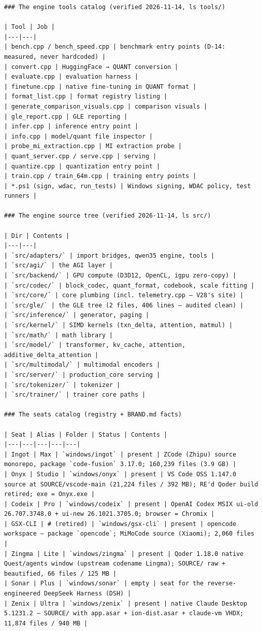 \begin{Verbatim}[breaklines,breakanywhere,fontsize=\footnotesize]
### The engine tools catalog (verified 2026-11-14, ls tools/)

| Tool | Job |
|---|---|
| bench.cpp / bench_speed.cpp | benchmark entry points (D-14: measured, never hardcoded) |
| convert.cpp | HuggingFace → QUANT conversion |
| evaluate.cpp | evaluation harness |
| finetune.cpp | native fine-tuning in QUANT format |
| format_list.cpp | format registry listing |
| generate_comparison_visuals.cpp | comparison visuals |
| gle_report.cpp | GLE reporting |
| infer.cpp | inference entry point |
| info.cpp | model/quant file inspector |
| probe_mi_extraction.cpp | MI extraction probe |
| quant_server.cpp / serve.cpp | serving |
| quantize.cpp | quantization entry point |
| train.cpp / train_64m.cpp | training entry points |
| *.ps1 (sign, wdac, run_tests) | Windows signing, WDAC policy, test runners |

### The engine source tree (verified 2026-11-14, ls src/)

| Dir | Contents |
|---|---|
| `src/adapters/` | import bridges, qwen35 engine, tools |
| `src/agi/` | the AGI layer |
| `src/backend/` | GPU compute (D3D12, OpenCL, igpu zero-copy) |
| `src/codec/` | block_codec, quant_format, codebook, scale fitting |
| `src/core/` | core plumbing (incl. telemetry.cpp — V28's site) |
| `src/gle/` | the GLE tree (2 files, 406 lines — audited clean) |
| `src/inference/` | generator, paging |
| `src/kernel/` | SIMD kernels (txn_delta, attention, matmul) |
| `src/math/` | math library |
| `src/model/` | transformer, kv_cache, attention, additive_delta_attention |
| `src/multimodal/` | multimodal encoders |
| `src/server/` | production_core serving |
| `src/tokenizer/` | tokenizer |
| `src/trainer/` | trainer core paths |

### The seats catalog (registry + BRAND.md facts)

| Seat | Alias | Folder | Status | Contents |
|---|---|---|---|---|
| Ingot | Max | `windows/ingot` | present | ZCode (Zhipu) source monorepo, package `code-fusion` 3.17.0; 160,239 files (3.9 GB) |
| Onyx | Studio | `windows/onyx` | present | VS Code OSS 1.147.0 source at SOURCE/vscode-main (21,224 files / 392 MB); RE'd Qoder build retired; exe = Onyx.exe |
| Codeix | Pro | `windows/codeix` | present | OpenAI Codex MSIX ui-old 26.707.3748.0 + ui-new 26.1021.3705.0; browser = Chromix |
| GSX-CLI | # (retired) | `windows/gsx-cli` | present | opencode workspace — package `opencode`; MiMoCode source (Xiaomi); 2,060 files |
| Zingma | Lite | `windows/zingma` | present | Qoder 1.18.0 native Quest/agents window (upstream codename Lingma); SOURCE/ raw + beautified, 66 files / 125 MB |
| Sonar | Plus | `windows/sonar` | empty | seat for the reverse-engineered DeepSeek Harness (DSH) |
| Zenix | Ultra | `windows/zenix` | present | native Claude Desktop 5.1231.2 — SOURCE/ with app.asar + ion-dist.asar + claude-vm VHDX; 11,874 files / 940 MB |


\end{Verbatim}
